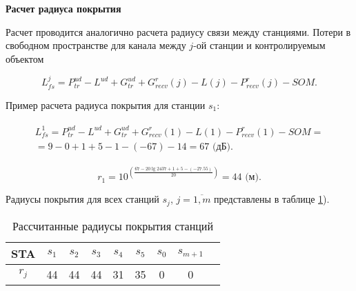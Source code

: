 \textbf{Расчет радиуса покрытия}



Расчет проводится аналогично расчета радиусу связи между станциями. 
Потери в свободном пространстве для канала между $j$-ой станции и контролируемым объектом

\begin{displaymath}
  L_{fs}^{j} = P_{tr}^{ud} - L^{ud} + G_{tr}^{ud} + G_{recv}^r(j) - L(j) - P_{recv}^r(j) - SOM.
\end{displaymath}


Пример расчета радиуса покрытия для станции $s_1$:

\begin{align}
    \begin{aligned}
 L_{fs}^{1} = P_{tr}^{ud} - L^{ud} + G_{tr}^{ud} + G_{recv}^r(1) - L(1) - P_{recv}^r(1) - SOM = \\ = 9 - 0 + 1 + 5 - 1 - (-67) - 14 = 67 \text{ (дБ)}.
    \end{aligned}
\end{align}

\begin{displaymath}
  r_{1} = 10^{\left(\frac{67 - 20\lg{2437} + 1 + 5 - (-27.55)}{20}\right)} = 44 \text{ (м)}.
\end{displaymath}

Радиусы покрытия для всех станций $ s_j $, $ j = \overline{1, m} $ представлены в таблице \cref{tab:part4_rj_mip}).

\begin{table}[h!]\begin{center}
  \begin{tabular}{|c||c|c|c|c|c|c|c|c|}\hline
      STA & $s_1$ & $s_2$ & $s_3$ & $s_4$ & $s_5$ & $s_{0}$ & $s_{m+1}$\\ \hline \hline
      $r_{j}$ & 44 & 44 & 44 & 31 & 35 & 0 & 0\\ \hline
\end{tabular}\caption{Рассчитанные радиусы покрытия станций}\label{tab:part4_rj_mip}
\end{center}
\end{table}

